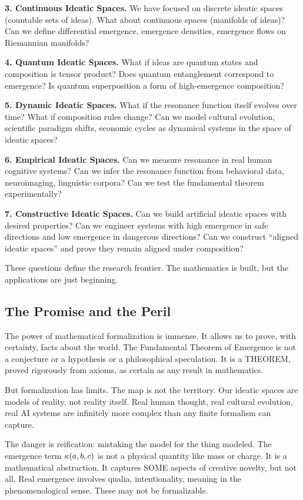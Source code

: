 \textbf{3. Continuous Ideatic Spaces.} We have focused on discrete ideatic spaces
(countable sets of ideas). What about continuous spaces (manifolds of ideas)?
Can we define differential emergence, emergence densities, emergence flows on
Riemannian manifolds?

\textbf{4. Quantum Ideatic Spaces.} What if ideas are quantum states and composition
is tensor product? Does quantum entanglement correspond to emergence? Is quantum
superposition a form of high-emergence composition?

\textbf{5. Dynamic Ideatic Spaces.} What if the resonance function itself evolves
over time? What if composition rules change? Can we model cultural evolution,
scientific paradigm shifts, economic cycles as dynamical systems in the space
of ideatic spaces?

\textbf{6. Empirical Ideatic Spaces.} Can we measure resonance in real human
cognitive systems? Can we infer the resonance function from behavioral data,
neuroimaging, linguistic corpora? Can we test the fundamental theorem experimentally?

\textbf{7. Constructive Ideatic Spaces.} Can we build artificial ideatic spaces
with desired properties? Can we engineer systems with high emergence in safe
directions and low emergence in dangerous directions? Can we construct ``aligned
ideatic spaces'' and prove they remain aligned under composition?

These questions define the research frontier. The mathematics is built, but the
applications are just beginning.

\subsection{The Promise and the Peril}

The power of mathematical formalization is immense. It allows us to prove, with
certainty, facts about the world. The Fundamental Theorem of Emergence is not
a conjecture or a hypothesis or a philosophical speculation. It is a THEOREM,
proved rigorously from axioms, as certain as any result in mathematics.

But formalization has limits. The map is not the territory. Our ideatic spaces
are models of reality, not reality itself. Real human thought, real cultural
evolution, real AI systems are infinitely more complex than any finite formalism
can capture.

The danger is reification: mistaking the model for the thing modeled. The
emergence term $\kappa(a,b,c)$ is not a physical quantity like mass or charge.
It is a mathematical abstraction. It captures SOME aspects of creative novelty,
but not all. Real emergence involves qualia, intentionality, meaning in the
phenomenological sense. These may not be formalizable.

